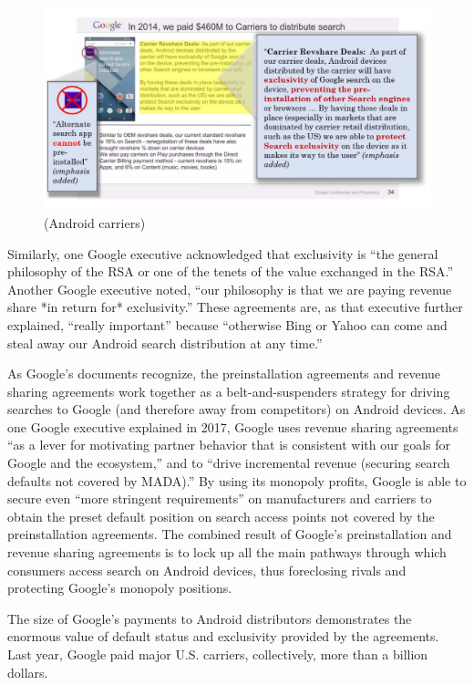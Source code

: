 \documentclass[11pt,b5paper,headings=small]{scrartcl}
\begin{document}
\begin{enumerate}
\begin{figure}
\includegraphics{US-v-Google-Complaint-figures/fig11.PNG}
\caption{(Android carriers)}
\end{figure}


Similarly, one Google executive acknowledged that exclusivity is “the general
philosophy of the RSA or one of the tenets of the value exchanged in the RSA.” Another Google
executive noted, “our philosophy is that we are paying revenue share *in return for* exclusivity.”
These agreements are, as that executive further explained, “really important” because “otherwise
Bing or Yahoo can come and steal away our Android search distribution at any time.”


As Google’s documents recognize, the preinstallation agreements and revenue
sharing agreements work together as a belt-and-suspenders strategy for driving searches to
Google (and therefore away from competitors) on Android devices. As one Google executive
explained in 2017, Google uses revenue sharing agreements “as a lever for motivating partner
behavior that is consistent with our goals for Google and the ecosystem,” and to “drive
incremental revenue (securing search defaults not covered by MADA).” By using its monopoly
profits, Google is able to secure even “more stringent requirements” on manufacturers and
carriers to obtain the preset default position on search access points not covered by the
preinstallation agreements. The combined result of Google’s preinstallation and revenue sharing
agreements is to lock up all the main pathways through which consumers access search on
Android devices, thus foreclosing rivals and protecting Google’s monopoly positions.


The size of Google’s payments to Android distributors demonstrates the
enormous value of default status and exclusivity provided by the agreements. Last year, Google
paid major U.S. carriers, collectively, more than a billion dollars.


\end{enumerate}
\end{document}
